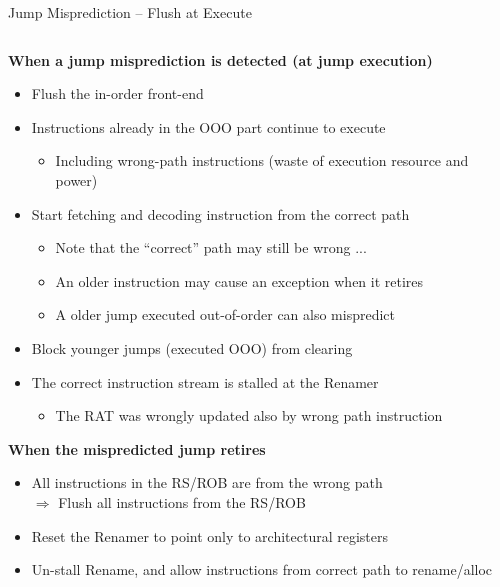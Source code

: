 \documentclass[aspectratio=169,12pt]{beamer}
\begin{document}
\begin{frame}{Jump Misprediction -- Flush at Execute}
    \centering
    
    \begin{columns}[T]
        \begin{column}{0.9\textwidth}
            \textbf{When a jump misprediction is detected (at jump execution)}
            \begin{itemize}
                \item Flush the in-order front-end
                \item Instructions already in the OOO part continue to execute
                \begin{itemize}
                    \item Including wrong-path instructions (waste of execution resource and power)
                \end{itemize}
                \item Start fetching and decoding instruction from the correct path
                \begin{itemize}
                    \item Note that the ``correct'' path may still be wrong ...
                    \item An older instruction may cause an exception when it retires
                    \item A older jump executed out-of-order can also mispredict
                \end{itemize}
                \item Block younger jumps (executed OOO) from clearing
                \item The correct instruction stream is stalled at the Renamer
                \begin{itemize}
                    \item The RAT was wrongly updated also by wrong path instruction
                \end{itemize}
            \end{itemize}
            
            \textbf{When the mispredicted jump retires}
            \begin{itemize}
                \item All instructions in the RS/ROB are from the wrong path \\
                $\Rightarrow$ Flush all instructions from the RS/ROB
                \item Reset the Renamer to point only to architectural registers
                \item Un-stall Rename, and allow instructions from correct path to rename/alloc
            \end{itemize}
        \end{column}
    \end{columns}
\end{frame}
\end{document}
